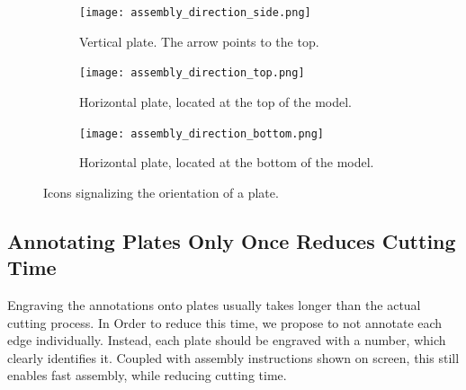 \documentclass[../ClassicThesis.tex]{subfiles}
\begin{document}
\begin{figure}
  \centering
  \begin{subfigure}[b]{0.3\textwidth}
    \centering
    \texttt{[image: assembly\_direction\_side.png]}
    \caption{Vertical plate. The arrow points to the top.}
    \label{fig:assemblyicons:side}
  \end{subfigure}
  \begin{subfigure}[b]{0.3\textwidth}
    \centering
    \texttt{[image: assembly\_direction\_top.png]}
    \caption{Horizontal plate, located at the top of the model.}
    \label{fig:assemblyicons:top}
  \end{subfigure}
  \begin{subfigure}[b]{0.3\textwidth}
    \centering
    \texttt{[image: assembly\_direction\_bottom.png]}
    \caption{Horizontal plate, located at the bottom of the model.}
    \label{fig:assemblyicons:bottom}
  \end{subfigure}
  \caption{Icons signalizing the orientation of a plate.}
  \label{fig:assemblyicons}
\end{figure}

\subsection{Annotating Plates Only Once Reduces Cutting Time}

Engraving the annotations onto plates usually takes longer than the actual cutting process. In Order to reduce this time, we propose to not annotate each edge individually. Instead, each plate should be engraved with a number, which clearly identifies it. Coupled with assembly instructions shown on screen, this still enables fast assembly, while reducing cutting time.
\end{document}
